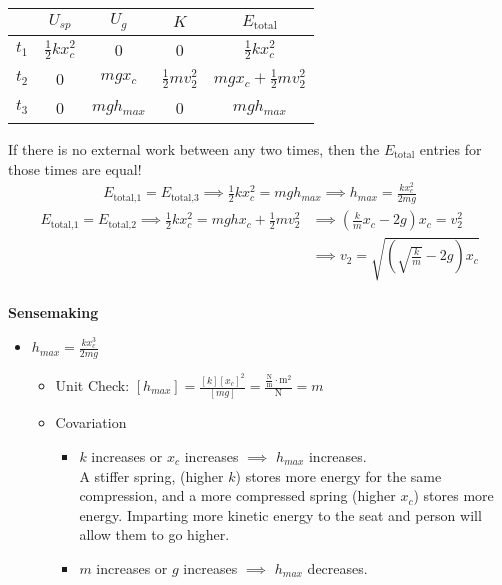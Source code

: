 \documentclass[]{article}
\begin{document}
\begin{TeacherMargin}
\begin{center}
	\begin{tabular}{c||c|c|c||c}
		& $U_{sp}$ & $U_{g}$ & $K$ & $E_{\text{total}}$ \\ \hline
		$t_{1}$ & $\frac{1}{2}kx_{c}^{2}$ & 0 & 0 & $\frac{1}{2}kx_{c}^{2}$ \\ \hline
		$t_{2}$ & 0 & $mgx_{c}$ & $\frac{1}{2}mv_{2}^{2}$ & $mgx_{c}+\frac{1}{2}mv_{2}^{2}$ \\ \hline
		$t_{3}$ & 0 & $mgh_{max}$ & 0 & $mgh_{max}$
	\end{tabular}
\end{center}
If there is no external work between any two times, then the $E_{\text{total}}$ entries for those times are equal!
\begin{align*}
	E_{\text{total,1}} = E_{\text{total,3}} \implies \frac{1}{2}kx_{c}^{2} = mgh_{max} \implies h_{max}=\frac{kx_{c}^{2}}{2mg}
\end{align*}
\begin{align*}
	E_{\text{total,1}} = E_{\text{total,2}} \implies
	\frac{1}{2}kx_{c}^{2} = mghx_{c} + \frac{1}{2}mv_{2}^{2} & \implies
	\left(\frac{k}{m}x_{c}-2g\right)x_{c} = v_{2}^{2} \\
	& \implies
	v_{2} = \sqrt{\left(\sqrt{\frac{k}{m}}-2g\right)x_{c}}
\end{align*}
\vspace{-1.8cm} \\
\textbf{Sensemaking} \\
\begin{itemize}
	\item $h_{max}=\frac{kx_{c}^{3}}{2mg}$
	\begin{itemize}
		\item Unit Check: $[h_{max}]=\frac{[k][x_{c}]^{2}}{[mg]} = \frac{\frac{\text{N}}{\text{m}}\cdot\text{m}^{2}}{\text{N}} = m$
		\item Covariation
		\begin{itemize}
			\item $k$ increases or $x_{c}$ increases $\implies$ $h_{max}$ increases. \\
			A stiffer spring, (higher $k$) stores more energy for the same compression, and a more compressed spring (higher $x_{c}$) stores more energy. Imparting more kinetic energy to the seat and person will allow them to go higher.
			\item $m$ increases or $g$ increases $\implies$ $h_{max}$ decreases. \\

\end{itemize}
\end{itemize}
\end{itemize}
\end{TeacherMargin}
\end{document}
